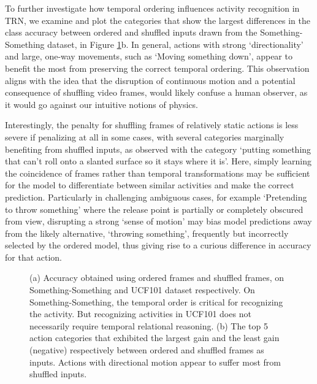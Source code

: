 \documentclass[runningheads]{llncs}
\begin{document}
To further investigate how temporal ordering influences activity recognition in TRN, we examine and plot the categories that show the largest differences in the class accuracy between ordered and shuffled inputs drawn from the Something-Something dataset, in Figure \ref{fig:frame_order}b. In general, actions with strong `directionality’ and large, one-way movements, such as `Moving something down', appear to benefit the most from preserving the correct temporal ordering. This observation aligns with the idea that the disruption of continuous motion and a potential consequence of shuffling video frames, would likely confuse a human observer, as it would go against our intuitive notions of physics.

Interestingly, the penalty for shuffling frames of relatively static actions is less severe if penalizing at all in some cases, with several categories marginally benefiting from shuffled inputs, as observed with the category `putting something that can't roll onto a slanted surface so it stays where it is'. Here, simply learning the coincidence of frames rather than temporal transformations may be sufficient for the model to differentiate between similar activities and make the correct prediction. Particularly in challenging ambiguous cases, for example `Pretending to throw something' where the release point is partially or completely obscured from view, disrupting a strong `sense of motion' may bias model predictions away from the likely alternative, `throwing something', frequently but incorrectly selected by the ordered model, thus giving rise to a curious difference in accuracy for that action.

\begin{figure}\vspace{-10mm}
    \centering
    \vspace{-4mm}
    \caption{(a) Accuracy obtained using ordered frames and shuffled frames, on Something-Something and UCF101 dataset respectively. On Something-Something, the temporal order is critical for recognizing the activity. But recognizing activities in UCF101 does not necessarily require temporal relational reasoning. (b) The top 5 action categories that exhibited the largest gain and the least gain (negative) respectively between ordered and shuffled frames as inputs. Actions with directional motion appear to suffer most from shuffled inputs.}
\label{fig:frame_order}\vspace{-3mm}
\end{figure}
\end{document}
